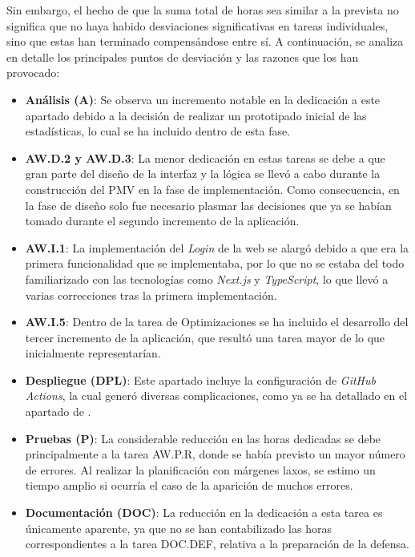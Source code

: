 Sin embargo, el hecho de que la suma total de horas sea similar a la prevista no significa que no haya habido desviaciones significativas en tareas individuales, sino que estas han terminado compensándose entre sí. A continuación, se analiza en detalle los principales puntos de desviación y las razones que los han provocado:

\begin{itemize}
    \item \textbf{Análisis (A)}: Se observa un incremento notable en la dedicación a este apartado debido a la decisión de realizar un prototipado inicial de las estadísticas, lo cual se ha incluido dentro de esta fase.
    \item \textbf{AW.D.2 y AW.D.3}: La menor dedicación en estas tareas se debe a que gran parte del diseño de la interfaz y la lógica se llevó a cabo durante la construcción del PMV en la fase de implementación. Como consecuencia, en la fase de diseño solo fue necesario plasmar las decisiones que ya se habían tomado durante el segundo incremento de la aplicación.
    \item \textbf{AW.I.1}: La implementación del \textit{Login} de la web se alargó debido a que era la primera funcionalidad que se implementaba, por lo que no se estaba del todo familiarizado con las tecnologías como \textit{Next.js} y \textit{TypeScript}, lo que llevó a varias correcciones tras la primera implementación.
    \item \textbf{AW.I.5}: Dentro de la tarea de Optimizaciones se ha incluido el desarrollo del tercer incremento de la aplicación, que resultó una tarea mayor de lo que inicialmente representarían.
    \item \textbf{Despliegue (DPL)}: Este apartado incluye la configuración de \textit{GitHub Actions}, la cual generó diversas complicaciones, como ya se ha detallado en el apartado de .
    \item \textbf{Pruebas (P)}: La considerable reducción en las horas dedicadas se debe principalmente a la tarea AW.P.R, donde se había previsto un mayor número de errores. Al realizar la planificación con márgenes laxos, se estimo un tiempo amplio si ocurría el caso de la aparición de muchos errores.
    \item \textbf{Documentación (DOC)}: La reducción en la dedicación a esta tarea es únicamente aparente, ya que no se han contabilizado las horas correspondientes a la tarea DOC.DEF, relativa a la preparación de la defensa.
\end{itemize}

